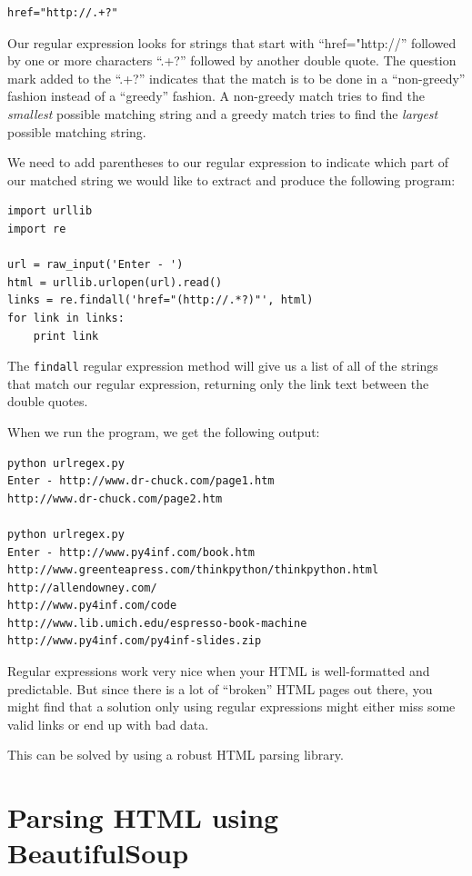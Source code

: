 \documentclass[11pt]{book}
\begin{document}
\beforeverb
\begin{verbatim}
href="http://.+?"
\end{verbatim}
\afterverb
%
Our regular expression looks for strings that start with
``href="http://'' followed by one or more characters
``.+?'' followed by another double quote.  The question mark 
added to the ``.+?'' indicates that the match is to be done
in a ``non-greedy'' fashion instead of a ``greedy'' fashion.  
A non-greedy match tries to find the {\em smallest} possible matching
string and a greedy match tries to find the {\em largest} possible
matching string.

We need to add parentheses to our regular expression to indicate
which part of our matched string we would like to extract and
produce the following program:

\beforeverb
\begin{verbatim}
import urllib
import re

url = raw_input('Enter - ')
html = urllib.urlopen(url).read()
links = re.findall('href="(http://.*?)"', html)
for link in links:
    print link
\end{verbatim}
\afterverb
%
The {\tt findall} regular expression method will give us a list of all
of the strings that match our regular expression, returning only
the link text between the double quotes.

When we run the program, we get the following output:

\beforeverb
\begin{verbatim}
python urlregex.py 
Enter - http://www.dr-chuck.com/page1.htm
http://www.dr-chuck.com/page2.htm

python urlregex.py 
Enter - http://www.py4inf.com/book.htm
http://www.greenteapress.com/thinkpython/thinkpython.html
http://allendowney.com/
http://www.py4inf.com/code
http://www.lib.umich.edu/espresso-book-machine
http://www.py4inf.com/py4inf-slides.zip
\end{verbatim}
\afterverb
%
Regular expressions work very nice when your HTML is well-formatted
and predictable.  But since there is a lot of ``broken'' HTML pages
out there, you might find that a solution only using 
regular expressions might either miss some valid links or end up 
with bad data.

This can be solved by using a robust HTML parsing library.

\section{Parsing HTML using BeautifulSoup}
\end{document}
